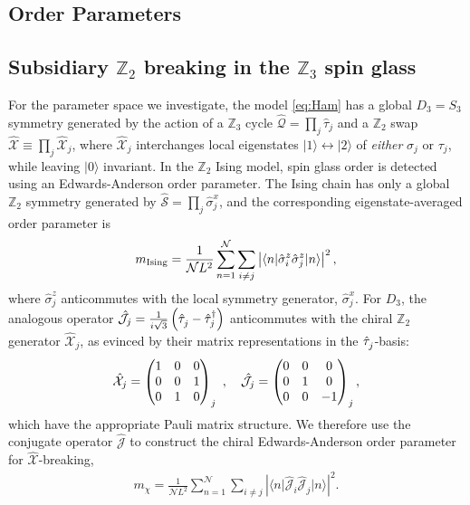 \documentclass[prb,aps, twocolumn, superscriptaddress]{revtex4-1}
\newcommand{\be}{\begin{eqnarray}}
\newcommand{\ee}{\end{eqnarray}}
\def\ket#1{{|#1\rangle}}
\def\bra#1{{\langle #1 |}}
\begin{document}
\begin{appendix}

\section{Order Parameters} \label{sec:OPs}
\subsection{Subsidiary $\mathbb{Z}_2$ breaking in the $\mathbb{Z}_3$ spin glass}
\label{subsec:subsidZ2}
For the parameter space we investigate, the model \eqref{eq:Ham} has a global $D_3 = S_3$ symmetry generated by the action of a $\mathbb{Z}_3$ cycle ${\hat{\mathcal{Q}}} = \prod_j {\hat{\tau}}_j$ and a $\mathbb{Z}_2$ swap ${\hat{\mathcal{X}}} \equiv \prod_j {\hat{\mathcal{X}}}_j$, where ${\hat{\mathcal{X}}}_j$ interchanges local eigenstates $\ket{1} \leftrightarrow \ket{2}$ of \emph{either} $\sigma_j$ or $\tau_j$, while leaving $\ket{0}$ invariant. In the $\mathbb{Z}_2$ Ising model, spin glass order is detected using an Edwards-Anderson order parameter. The Ising chain has only a global $\mathbb{Z}_2$ symmetry generated by $ {\hat{\mathcal{S}}} = \prod_j \hat{\sigma}^x_j$, and the corresponding eigenstate-averaged order parameter is
\be  m_{\rm Ising} = \frac{1}{\mathcal{N}L^2} \sum_{n=1}^{\mathcal{N}}\sum_{i\neq j} \left|\bra{n}{\hat{\sigma}^z_i \hat{\sigma}^z_j }\ket{n}\right|^2, \ee
where $\hat{\sigma}^z_j$ anticommutes with the local symmetry generator, ${\hat{\sigma}}^x_j$. For $D_3$, the analogous operator ${\hat{\mathcal{J}}}_j = \frac{1}{i \sqrt{3}} \left( {\hat{\tau}}^{\vphantom{\dagger}}_j - {\hat{\tau}}^{\dagger}_j \right)$ anticommutes with the chiral $\mathbb{Z}_2$ generator ${\hat{\mathcal{X}}}_j$, as evinced by 
their matrix representations in the $\hat{\tau}^{\vphantom{\dagger}}_j$-basis:
\be  {\hat{\mathcal{X}}}_j = \begin{pmatrix} 1 & 0 & 0 \\ 0 & 0 & 1 \\ 0 & 1 & 0 \end{pmatrix}_j~,\quad  {\hat{\mathcal{J}}}_j = \begin{pmatrix} 0 & 0 & 0 \\ 0 & 1 & 0 \\ 0 & 0 & {\rm-}1 \end{pmatrix}_j ,
\ee
which have the appropriate Pauli matrix structure. We therefore use the conjugate operator ${\hat{\mathcal{J}}}$ to construct the chiral Edwards-Anderson order parameter for ${\hat{\mathcal{X}}}$-breaking, 
\be m_{\chi} = \frac{1}{\mathcal{N}L^2} \sum_{n=1}^{\mathcal{N}}\sum_{i\neq j} \left|\bra{n}{\hat{\mathcal{J}}}_i {\hat{\mathcal{J}}}_j \ket{n}\right|^2. \ee


\end{appendix}
\end{document}
